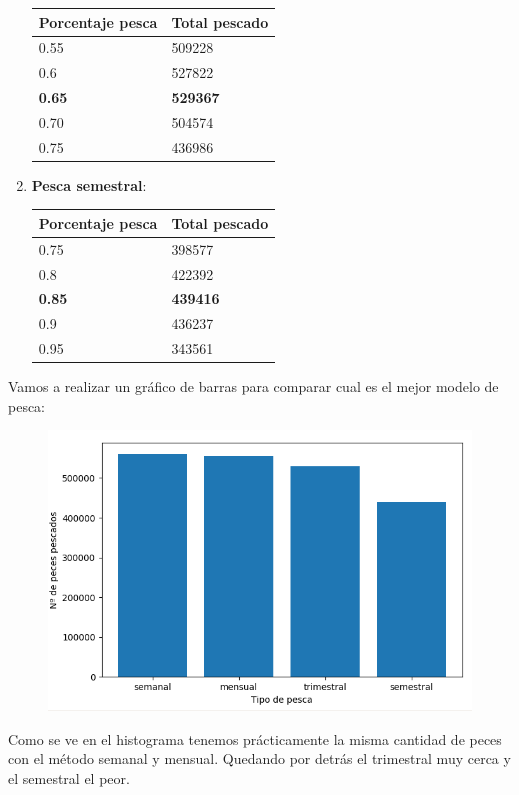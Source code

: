 \documentclass[]{article}
\begin{document}
\begin{enumerate}
	\begin{table}[H]
		\begin{center}
			\begin{tabular}{|l|l|}
				\hline
				Porcentaje pesca & Total pescado\\
				\hline \hline
				0.55 & 509228
				\\ \hline
				0.6 & 527822
				\\ \hline
				\textbf{0.65} & \textbf{529367}
				\\ \hline
				0.70 & 504574
				\\ \hline
				0.75 & 436986
				\\ \hline
			\end{tabular}
			\label{tabla:sencilla}
		\end{center}
	\end{table}
	\item \textbf{Pesca semestral}:
	
	\begin{table}[H]
		\begin{center}
			\begin{tabular}{|l|l|}
				\hline
				Porcentaje pesca & Total pescado\\
				\hline \hline
				0.75 & 398577
				\\ \hline
				0.8 & 422392
				\\ \hline
				\textbf{0.85} & \textbf{439416}
				\\ \hline
				0.9 & 436237
				\\ \hline
				0.95 & 343561
				\\ \hline
			\end{tabular}
			\label{tabla:sencilla}
		\end{center}
	\end{table}
\end{enumerate}


Vamos a realizar un gráfico de barras para comparar cual es el mejor modelo de pesca:
\begin{figure}[H]
	\centering
	\includegraphics[width=1\linewidth]{img/screenshot0025}
	\label{fig:screenshot0025}
\end{figure}
\newpage
Como se ve en el histograma tenemos prácticamente la misma cantidad de peces con el método semanal y mensual. Quedando por detrás el trimestral muy cerca y el semestral el peor.
\end{document}
